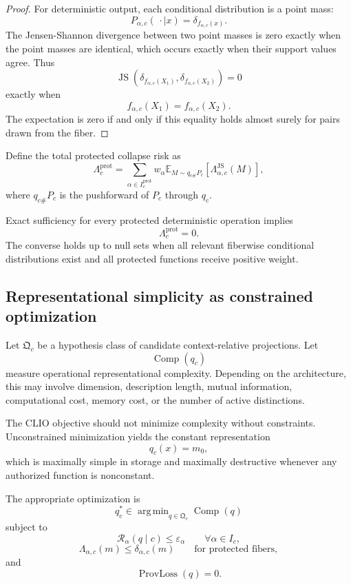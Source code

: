 \documentclass[11pt]{article}
\theoremstyle{definition}
\DeclareMathOperator{\argmin}{arg\,min}
\DeclareMathOperator{\Comp}{Comp}
\newcommand{\E}{\mathbb{E}}
\newcommand{\eps}{\varepsilon}
\begin{document}
\begin{proof}
For deterministic output, each conditional distribution is a point mass:
\[
P_{\alpha,c}(\,\cdot\mid x)
=
\delta_{f_{\alpha,c}(x)}.
\]
The Jensen-Shannon divergence between two point masses is zero exactly when the point masses are identical, which occurs exactly when their support values agree. Thus
\[
\operatorname{JS}
\left(
\delta_{f_{\alpha,c}(X_1)},
\delta_{f_{\alpha,c}(X_2)}
\right)
=
0
\]
exactly when
\[
f_{\alpha,c}(X_1)
=
f_{\alpha,c}(X_2).
\]
The expectation is zero if and only if this equality holds almost surely for pairs drawn from the fiber.
\end{proof}

Define the total protected collapse risk as
\[
\Lambda_c^{\mathrm{prot}}
=
\sum_{\alpha\in I_c^{\mathrm{prot}}}
w_\alpha
\E_{M\sim q_{c\#}P_c}
\left[
\Lambda_{\alpha,c}^{\mathrm{JS}}(M)
\right],
\]
where \(q_{c\#}P_c\) is the pushforward of \(P_c\) through \(q_c\).

Exact sufficiency for every protected deterministic operation implies
\[
\Lambda_c^{\mathrm{prot}}=0.
\]
The converse holds up to null sets when all relevant fiberwise conditional distributions exist and all protected functions receive positive weight.

\subsection{Representational simplicity as constrained optimization}

Let \(\mathfrak Q_c\) be a hypothesis class of candidate context-relative projections. Let
\[
\Comp(q_c)
\]
measure operational representational complexity. Depending on the architecture, this may involve dimension, description length, mutual information, computational cost, memory cost, or the number of active distinctions.

The CLIO objective should not minimize complexity without constraints. Unconstrained minimization yields the constant representation
\[
q_c(x)=m_0,
\]
which is maximally simple in storage and maximally destructive whenever any authorized function is nonconstant.

The appropriate optimization is
\[
q_c^{*}
\in
\argmin_{q\in\mathfrak Q_c}
\Comp(q)
\]
subject to
\[
\mathcal R_\alpha(q\mid c)
\leq
\eps_\alpha
\qquad
\forall\alpha\in I_c,
\]
\[
\Lambda_{\alpha,c}(m)
\leq
\delta_{\alpha,c}(m)
\qquad
\text{for protected fibers},
\]
and
\[
\operatorname{ProvLoss}(q)=0.
\]
\end{document}
